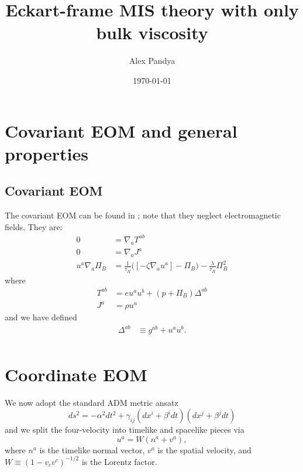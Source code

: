 \documentclass[12pt]{article}
\numberwithin{equation}{section}
\begin{document}
\title{Eckart-frame MIS theory with only bulk viscosity}
\author{Alex Pandya}
\date{\today}
\maketitle

\section{Covariant EOM and general properties}

\subsection{Covariant EOM}

The covariant EOM can be found in \cite{Bemfica19}; note that they neglect electromagnetic fields.
They are:
\begin{align}
0 &= \nabla_{a} T^{ab} \label{eq:Tab_cons_law} \\
0 &= \nabla_{a} J^{a} \label{eq:Ja_cons_law} \\
u^a \nabla_a \Pi_B &= \frac{1}{\tau_{\Pi}} \Big( [- \zeta \nabla_a u^a] - \Pi_B \Big) - \frac{\lambda}{\tau_{\Pi}} \Pi_B^2 \label{eq:Pi_cov_EOM}
\end{align}
where
\begin{align}
T^{ab} &= e u^a u^b + (p + \Pi_B) \Delta^{ab} \label{eq:Tab} \\
J^{a}  &= \rho u^a \label{eq:Ja}
\end{align}
and we have defined
\begin{equation}
\begin{aligned}
\Delta^{ab} &\equiv g^{ab} + u^a u^b. \\
\end{aligned}
\end{equation}


\section{Coordinate EOM}

We now adopt the standard ADM metric ansatz
\begin{equation} \label{eq:metric}
ds^2 = - \alpha^2 dt^2 + \gamma_{ij} (dx^i + \beta^i dt) (dx^j + \beta^j dt)
\end{equation}
and we split the four-velocity into timelike and spacelike pieces via
\begin{equation}
u^a = W (n^a + v^a),
\end{equation}
where $n^a$ is the timelike normal vector, $v^a$ is the spatial velocity, and $W \equiv (1-v_c v^c)^{-1/2}$ is the Lorentz factor.
\end{document}
